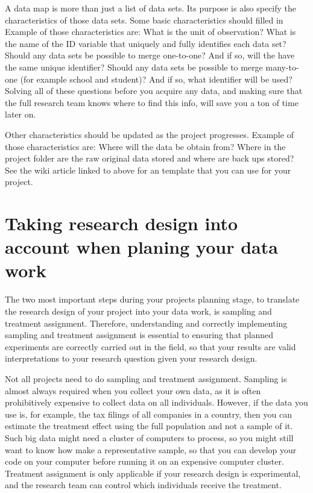 A data map is more than just a list of data sets. 
Its purpose is also specify the characteristics of those data sets. 
Some basic characteristics should filled in
Example of those characteristics are: 
What is the unit of observation? 
What is the name of the ID variable that uniquely and fully identifies each data set? 
Should any data sets be possible to merge one-to-one? 
And if so, will the have the same unique identifier?
Should any data sets be possible to merge many-to-one (for example school and student)? 
And if so, what identifier will be used?
Solving all of these questions before you acquire any data, 
and making sure that the full research team knows where to find this info,
will save you a ton of time later on.

Other characteristics should be updated as the project progresses.
Example of those characteristics are:
Where will the data be obtain from?
Where in the project folder are the raw original data stored and where are back ups stored?
See the wiki article linked to above for an template that you can use for your project.



\section{Taking research design into account when planing your data work}

The two most important steps during your projects planning stage,
to translate the research design of your project into your data work,
is sampling and treatment assignment.
Therefore, understanding and correctly implementing sampling and treatment assignment
is essential to ensuring that planned experiments
are correctly carried out in the field, so that your results
are valid interpretations to your research question given your research design.

Not all projects need to do sampling and treatment assignment. 
Sampling is almost always required when you collect your own data, 
as it is often prohibitively expensive to collect data on all individuals. 
However, if the data you use is, for example, the tax filings of all companies in a country,
then you can estimate the treatment effect using the full population and not a sample of it. 
Such big data might need a cluster of computers to process,
so you might still want to know how make a representative sample, 
so that you can develop your code on your computer before running it on an expensive computer cluster.
Treatment assignment is only applicable if your research design is experimental,
and the research team can control which individuals receive the treatment. 

